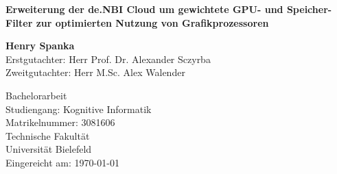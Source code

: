 
\begin{titlepage}
	
	
	\thispagestyle{frontpage}
	
	\begin{center}
		
		\vspace*{6\baselineskip}
		
		{\LARGE \textbf{Erweiterung der de.NBI Cloud um gewichtete GPU- und Speicher-Filter zur optimierten Nutzung von Grafikprozessoren\\}}
		
		
        \vspace*{1,5\baselineskip}

		\large{\textbf{Henry Spanka}}\\
		\large{Erstgutachter: Herr Prof. Dr. Alexander Sczyrba}\\
		\large{Zweitgutachter: Herr M.Sc. Alex Walender}\\
		
		\vspace{1,5\baselineskip}
		
		\large{Bachelorarbeit}\\
		\large{Studiengang: Kognitive Informatik}\\
		\large{Matrikelnummer: 3081606}\\
		
		\vspace{1,5\baselineskip}
		\large{Technische Fakultät}\\
		\large{Universität Bielefeld}\\

		\vspace{1,5\baselineskip}
		\large{Eingereicht am: \today}

	\end{center}
	
\end{titlepage}
